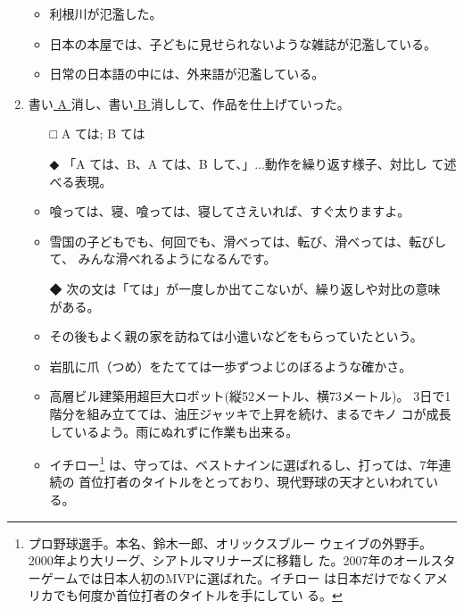 \documentclass[
uplatex,
b5paper,
10pt,
dvipdfmx
]{jsbook}
\begin{document}
\begin{enumerate}
\begin{itemize}
 \item 利根川が氾濫した。
 \item 日本の本屋では、子どもに見せられないような雑誌が氾濫している。
 \item 日常の日本語の中には、外来語が氾濫している。
\end{itemize}


\item  書い\underline{ A }消し、書い\underline{ B }消しして、作品を仕上げていった。

 \begin{itemize}
  \item[□] A ては; B ては
  \item[◆] 「A ては、B、A ては、B して、」...動作を繰り返す様子、対比し
	    て述べる表現。
 \end{itemize}

\begin{itemize}
 \item 喰っては、寝、喰っては、寝してさえいれば、すぐ太りますよ。
 \item 雪国の子どもでも、何回でも、滑べっては、転び、滑べっては、転びして、
       みんな滑べれるようになるんです。
\end{itemize}

\begin{itemize}
  \item[◆] 次の文は「ては」が一度しか出てこないが、繰り返しや対比の意味
	    がある。
\end{itemize}

\begin{itemize}
 \item その後もよく親の家を訪ねては小遣いなどをもらっていたという。
 \item 岩肌に爪（つめ）をたてては一歩ずつよじのぼるような確かさ。
 \item 高層ビル建築用超巨大ロボット(縦52メートル、横73メートル)。
       3日で1階分を組み立てては、油圧ジャッキで上昇を続け、まるでキノ
       コが成長しているよう。雨にぬれずに作業も出来る。
 \item イチロー\footnote{プロ野球選手。本名、鈴木一郎、オリックスブルー
       ウェイブの外野手。2000年より大リーグ、シアトルマリナーズに移籍し
       た。2007年のオールスターゲームでは日本人初のMVPに選ばれた。イチロー
       は日本だけでなくアメリカでも何度か首位打者のタイトルを手にしてい
       る。} は、守っては、ベストナインに選ばれるし、打っては、7年連続の
       首位打者のタイトルをとっており、現代野球の天才といわれている。
\end{itemize}


\end{enumerate}
\end{document}
